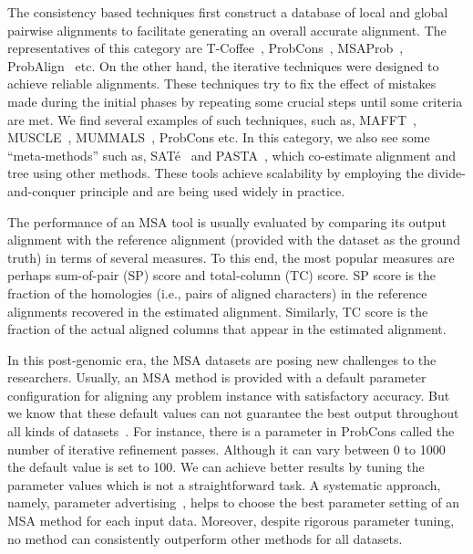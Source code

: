 The consistency based techniques first construct a database of local and global pairwise alignments to facilitate generating an overall accurate alignment. The representatives of this category are T-Coffee~\citep{notredame2000t}, ProbCons~\citep{do2005probcons}, MSAProb~\citep{liu2010msaprobs}, ProbAlign~\citep{roshan2006probalign} etc. On the other hand, the iterative techniques were designed to achieve reliable alignments. These techniques try to fix the effect of mistakes made during the initial phases by repeating some crucial steps until some criteria are met. We find several examples of such techniques, such as, MAFFT~\citep{katoh2002mafft}, MUSCLE~\citep{edgar2004muscle}, MUMMALS~\citep{pei2006mummals}, ProbCons%
etc. In this category, we also see some ``meta-methods'' such as, SAT\'e~\citep{liu2009rapid} and PASTA~\citep{mirarab2015pasta}, which co-estimate alignment and tree using other methods. These tools achieve scalability by employing the divide-and-conquer principle and are being used widely in practice.

The performance of an MSA tool is usually evaluated by comparing its output alignment with the reference alignment (provided with the dataset as the ground truth) in terms of several measures. To this end, the most popular measures are perhaps sum-of-pair (SP) score and total-column (TC) score. SP score is the fraction of the homologies (i.e., pairs of aligned characters) in the reference alignments recovered in the estimated alignment. Similarly, TC score is the fraction of the actual aligned columns that appear in the estimated alignment.

In this post-genomic era, the MSA datasets are posing new challenges to the researchers. Usually, an MSA method is provided with a default parameter configuration for aligning any problem instance with satisfactory accuracy. But we know that these default values can not guarantee the best output throughout all kinds of datasets~\citep{rubio2018characteristic}. For instance, there is a parameter in ProbCons called the number of iterative refinement passes. Although it can vary between 0 to 1000 the default value is set to 100. We can achieve better results by tuning the parameter values which is not a straightforward task. A systematic approach, namely, parameter advertising~\citep{deblasio2015parameter}, helps to choose the best parameter setting of an MSA method for each input data. Moreover, despite rigorous parameter tuning, no method can consistently outperform other methods for all datasets. 

